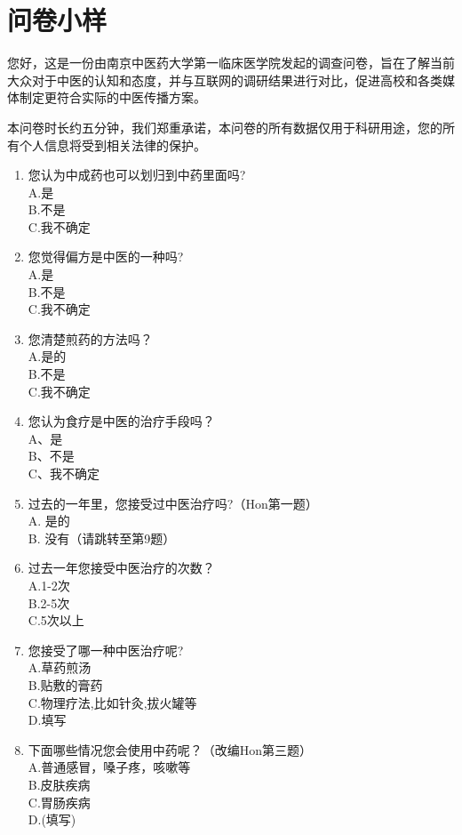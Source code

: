 \section{问卷小样}
您好，这是一份由南京中医药大学第一临床医学院发起的调查问卷，旨在了解当前大众对于中医的认知和态度，并与互联网的调研结果进行对比，促进高校和各类媒体制定更符合实际的中医传播方案。

本问卷时长约五分钟，我们郑重承诺，本问卷的所有数据仅用于科研用途，您的所有个人信息将受到相关法律的保护。

\begin{enumerate}
\item
您认为中成药也可以划归到中药里面吗?\\
A.是\\
B.不是\\
C.我不确定

\item
您觉得偏方是中医的一种吗?\\
A.是\\
B.不是\\
C.我不确定

\item
您清楚煎药的方法吗？\\
A.是的\\
B.不是\\
C.我不确定

\item
您认为食疗是中医的治疗手段吗？\\
A、是\\
B、不是\\
C、我不确定

\item
过去的一年里，您接受过中医治疗吗?（Hon第一题）\\
A. 是的\\
B. 没有（请跳转至第9题）

\item
过去一年您接受中医治疗的次数？\\
A.1-2次\\
B.2-5次\\
C.5次以上

\item
您接受了哪一种中医治疗呢?\\
A.草药煎汤\\
B.贴敷的膏药\\
C.物理疗法,比如针灸,拔火罐等\\
D.填写

\item 
下面哪些情况您会使用中药呢？（改编Hon第三题）\\
A.普通感冒，嗓子疼，咳嗽等\\
B.皮肤疾病\\
C.胃肠疾病\\
D.(填写)\underline{\makebox[6em]{}}


\end{enumerate}
